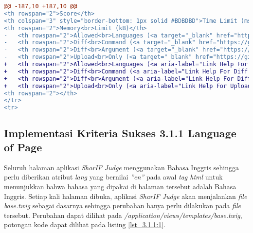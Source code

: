 \begin{itemize}
\begin{lstlisting}[language=diff, caption=Perubahan pada \textit{file} \textit{add\_assignment.twig}, label=lst_2.4.4:3, basicstyle=\ttfamily, frame=single,
columns=fullflexible, keepspaces=true, breaklines=true]
@@ -187,10 +187,10 @@
<th rowspan="2">Score</th>
<th colspan="3" style="border-bottom: 1px solid #BDBDBD">Time Limit (ms)</th>
<th rowspan="2">Memory<br>Limit (kB)</th>
- 	<th rowspan="2">Allowed<br>Languages (<a target="_blank" href="https://github.com/ifunpar/Sharif-Judge/blob/docs/v1.4/add_assignment.md#allowed-languages">?</a>)</th>
- 	<th rowspan="2">Diff<br>Command (<a target="_blank" href="https://github.com/ifunpar/Sharif-Judge/blob/docs/v1.4/add_assignment.md#diff-command">?</a>)</th>
- 	<th rowspan="2">Diff<br>Argument (<a target="_blank" href="https://github.com/ifunpar/Sharif-Judge/blob/docs/v1.4/add_assignment.md#diff-arguments">?</a>)</th>
- 	<th rowspan="2">Upload<br>Only (<a target="_blank" href="https://github.com/ifunpar/Sharif-Judge/blob/docs/v1.4/add_assignment.md#upload-only">?</a>)</th>
+ 	<th rowspan="2">Allowed<br>Languages (<a aria-label="Link Help For Languages" target="_blank" href="https://github.com/ifunpar/Sharif-Judge/blob/docs/v1.4/add_assignment.md#allowed-languages">?</a>)</th>
+ 	<th rowspan="2">Diff<br>Command (<a aria-label="Link Help For Diff Command" target="_blank" href="https://github.com/ifunpar/Sharif-Judge/blob/docs/v1.4/add_assignment.md#diff-command">?</a>)</th>
+ 	<th rowspan="2">Diff<br>Argument (<a aria-label="Link Help For Diff Argument" target="_blank" href="https://github.com/ifunpar/Sharif-Judge/blob/docs/v1.4/add_assignment.md#diff-arguments">?</a>)</th>
+ 	<th rowspan="2">Upload<br>Only (<a aria-label="Link Help For Upload Only" target="_blank" href="https://github.com/ifunpar/Sharif-Judge/blob/docs/v1.4/add_assignment.md#upload-only">?</a>)</th>
<th rowspan="2"></th>
</tr>
<tr>
\end{lstlisting}

\end{itemize}

\subsection{Implementasi Kriteria Sukses 3.1.1 Language of Page}
\label{subsec:implementasi_A_3.1.1}

Seluruh halaman aplikasi \textit{SharIF Judge} menggunakan Bahasa Inggris sehingga perlu diberikan atribut \textit{lang} yang bernilai \textit{''en''} pada awal \textit{tag html} untuk menunjukkan bahwa bahasa yang dipakai di halaman tersebut adalah Bahasa Inggris. Setiap kali halaman dibuka, aplikasi \textit{SharIF Judge} akan menjalankan \textit{file} \textit{base.twig} sebagai dasarnya sehingga perubahan hanya perlu dilakukan pada \textit{file} tersebut. Perubahan dapat dilihat pada \textit{/application/views/templates/base.twig}, potongan kode dapat dilihat pada listing \ref{lst_3.1.1:1}.

